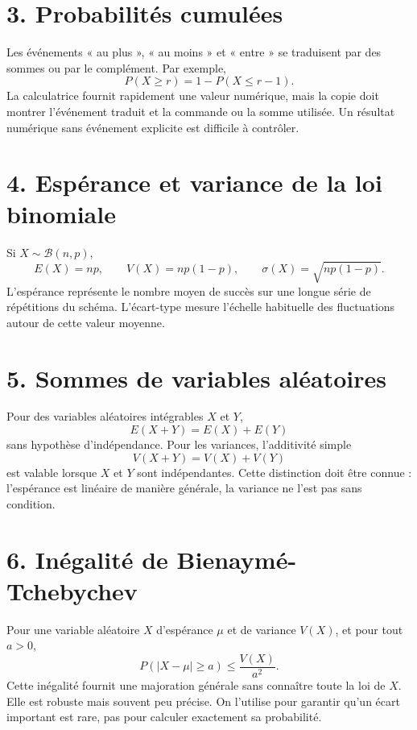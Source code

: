 
\section{3. Probabilités cumulées}
Les événements « au plus », « au moins » et « entre » se traduisent par des sommes ou par le complément. Par exemple,
\[
P(X\geq r)=1-P(X\leq r-1).
\]
La calculatrice fournit rapidement une valeur numérique, mais la copie doit montrer l’événement traduit et la commande ou la somme utilisée. Un résultat numérique sans événement explicite est difficile à contrôler.

\section{4. Espérance et variance de la loi binomiale}
Si $X\sim\mathcal{B}(n,p)$,
\[
E(X)=np,\qquad V(X)=np(1-p),\qquad \sigma(X)=\sqrt{np(1-p)}.
\]
L’espérance représente le nombre moyen de succès sur une longue série de répétitions du schéma. L’écart-type mesure l’échelle habituelle des fluctuations autour de cette valeur moyenne.

\section{5. Sommes de variables aléatoires}
Pour des variables aléatoires intégrables $X$ et $Y$,
\[
E(X+Y)=E(X)+E(Y)
\]
sans hypothèse d’indépendance. Pour les variances, l’additivité simple
\[
V(X+Y)=V(X)+V(Y)
\]
est valable lorsque $X$ et $Y$ sont indépendantes. Cette distinction doit être connue : l’espérance est linéaire de manière générale, la variance ne l’est pas sans condition.


\section{6. Inégalité de Bienaymé-Tchebychev}
Pour une variable aléatoire $X$ d’espérance $\mu$ et de variance $V(X)$, et pour tout $a>0$,
\[
P(|X-\mu|\geq a)\leq \frac{V(X)}{a^2}.
\]
Cette inégalité fournit une majoration générale sans connaître toute la loi de $X$. Elle est robuste mais souvent peu précise. On l’utilise pour garantir qu’un écart important est rare, pas pour calculer exactement sa probabilité.


